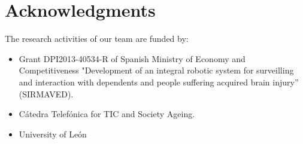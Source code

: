 \documentclass[conference]{IEEEtran}
\begin{document}


\section*{Acknowledgments}

The research activities of our team are funded by: 
\begin{itemize}
 \item Grant DPI2013-40534-R of Spanish Ministry of Economy and Competitiveness "Development of an integral robotic system for surveilling and interaction
with dependents and people suffering acquired brain injury” (SIRMAVED).
\item C\'atedra Telef\'onica for TIC and Society Ageing.
\item University of Le\'on
\end{itemize}






%   


%
% 
% 




\end{document}
